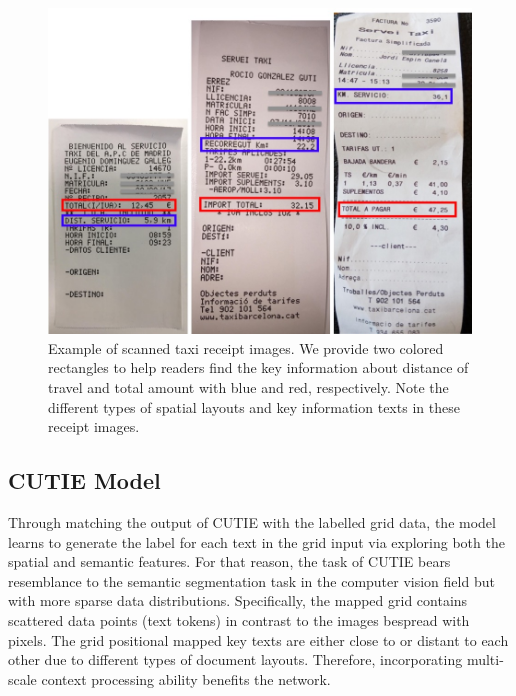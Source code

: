 \documentclass[10pt,twocolumn,letterpaper]{article}
\begin{document}
\begin{figure}
\begin{center}
\includegraphics[width=0.99\linewidth]{Receipts.jpg}
\end{center}
   \caption{Example of scanned taxi receipt images. We provide two colored rectangles to help readers find the key information about distance of travel and total amount with blue and red, respectively. Note the different types of spatial layouts and key information texts in these receipt images. }
\label{fig:receipts}
\end{figure}

\subsection{CUTIE Model}
Through matching the output of CUTIE with the labelled grid data, the model learns to generate the label for each text in the grid input via exploring both the spatial and semantic features. For that reason, the task of CUTIE bears resemblance to the semantic segmentation task in the computer vision field but with more sparse data distributions. Specifically, the mapped grid contains scattered data points (text tokens) in contrast to the images bespread with pixels. The grid positional mapped key texts are either close to or distant to each other due to different types of document layouts. Therefore, incorporating multi-scale context processing ability benefits the network.
\end{document}

